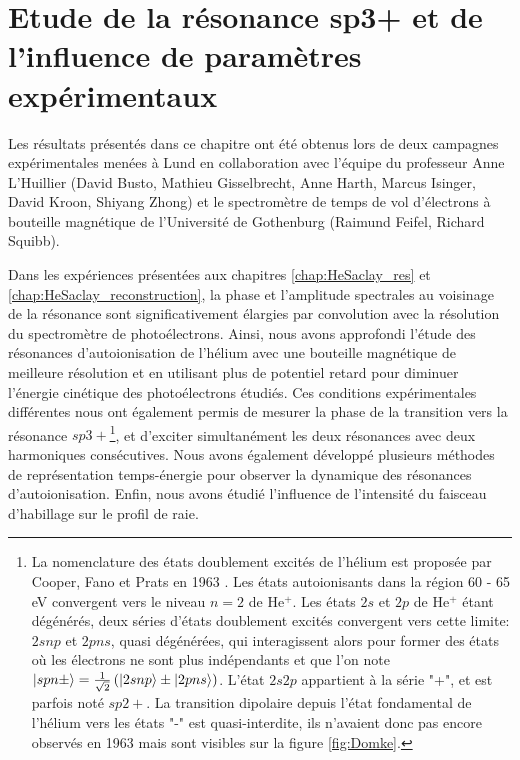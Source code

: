 \chapter[Etude de la résonance sp3+ et de l'influence de paramètres expérimentaux]{Etude de la résonance \MakeLowercase{sp3+} et de l'influence de paramètres expérimentaux}
\label{chap:He_Lund}
Les résultats présentés dans ce chapitre ont été obtenus lors de deux campagnes expérimentales menées à Lund en collaboration avec l'équipe du professeur Anne L'Huillier (David Busto, Mathieu Gisselbrecht, Anne Harth, Marcus Isinger, David Kroon, Shiyang Zhong) et le spectromètre de temps de vol d'électrons à bouteille magnétique de l'Université de Gothenburg (Raimund Feifel, Richard Squibb).


Dans les expériences présentées aux chapitres \ref{chap:HeSaclay_res} et \ref{chap:HeSaclay_reconstruction}, la phase et l'amplitude spectrales au voisinage de la résonance sont significativement élargies par convolution avec la résolution du spectromètre de photoélectrons. Ainsi, nous avons approfondi l'étude des résonances d'autoionisation de l'hélium avec une bouteille magnétique de meilleure résolution et en utilisant plus de potentiel retard pour diminuer l'énergie cinétique des photoélectrons étudiés. Ces conditions expérimentales différentes nous ont également permis de mesurer la phase de la transition vers la résonance $sp3+$\footnote{La nomenclature des états doublement excités de l'hélium est proposée par Cooper, Fano et Prats en 1963 . Les états autoionisants dans la région 60 - 65 eV convergent vers le niveau $n = 2$ de He$^+$. Les états $2s$ et $2p$ de He$^+$ étant dégénérés, deux séries d'états doublement excités convergent vers cette limite: $2snp$ et $2pns$, quasi dégénérées, qui interagissent alors pour former des états où les électrons ne sont plus indépendants et que l'on note $\ket{spn \pm} = \frac{1}{\sqrt{2}} \left( \ket{2snp} \pm \ket{2pns} \right)$. L'état $2s2p$ appartient à la série "+", et est parfois noté $sp2+$. La transition dipolaire depuis l'état fondamental de l'hélium vers les états "-" est quasi-interdite, ils n'avaient donc pas encore observés en 1963 mais sont visibles sur la figure \ref{fig:Domke}.}, et d'exciter simultanément les deux résonances avec deux harmoniques consécutives. Nous avons également développé plusieurs méthodes de représentation temps-énergie pour observer la dynamique des résonances d'autoionisation. Enfin, nous avons étudié l'influence de l'intensité du faisceau d'habillage sur le profil de raie.

